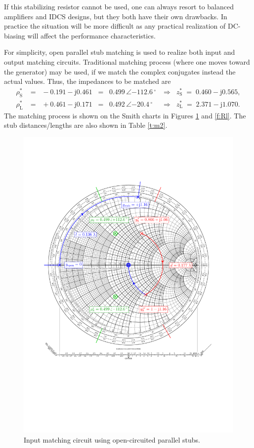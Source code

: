\documentclass[a4paper, 12pt]{article}
\begin{document}
If this stabilizing resistor cannot be used, one can always resort to balanced amplifiers 
and IDCS designs, but they both have their own drawbacks. In practice the situation will 
be more difficult as any practical realization of DC-biasing will affect the performance 
characteristics.

For simplicity, open parallel stub matching is used to realize both input and output matching 
circuits. Traditional matching process (where one moves toward the generator) may be used, if 
we match the complex conjugates instead the actual values. Thus, the impedances to be matched 
are
\begin{eqnarray}
\rho_\mathrm{S}^* &=\;\; -0.191 - \mathrm{j} 0.461 \;\;=\;\; 0.499 \,\angle {-112.6 {\,}^\circ} 	& \Rightarrow\;\; z_\mathrm{S}^* \;=\; 0.460 - \mathrm{j} 0.565, \\
\rho_\mathrm{L}^* &=\;\; +0.461 - \mathrm{j} 0.171 \;\;=\;\; 0.492 \,\angle {-20.4 {\,}^\circ} 	& \Rightarrow\;\; z_\mathrm{L}^* \;=\; 2.371 - \mathrm{j} 1.070.
\end{eqnarray}
The matching process is shown on the Smith charts in Figures \ref{f:Rs} and \ref{f:Rl}. 
The stub distances/lengths are also shown in Table \ref{t:m2}.

\begin{figure}[!h]
	\begin{center}
		\includegraphics[width=\textwidth]{img/srcSmith.pdf}
		\caption{Input matching circuit using open-circuited parallel stubs.}
		\label{f:Rs}
	\end{center}
\end{figure}
\end{document}

